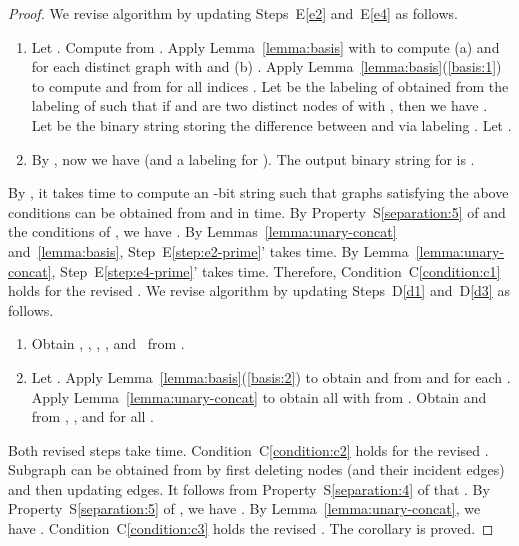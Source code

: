 \documentclass[12pt]{article}
\begin{document}
\begin{proof}
We revise algorithm  by updating Steps~E\ref{e2}
and~E\ref{e4} as follows.
\begin{enumerate}[\em E1':]
\addtolength{\itemsep}{-0.5\baselineskip}
\setcounter{enumi}{1}
\item 
\label{step:e2-prime}
Let .  Compute  from
.  Apply Lemma~\ref{lemma:basis} with
 to compute (a)
 and  for each distinct graph
 with  and (b) .
Apply Lemma~\ref{lemma:basis}(\ref{basis:1}) to compute
 and
 from  for all
indices .  Let  be the labeling of 
obtained from the labeling  of  such that if  and
 are two distinct nodes of  with
, then we have .
Let  be the binary string storing the difference
between  and  via labeling .  Let
.

\setcounter{enumi}{3}
\item 
\label{step:e4-prime}
By , now we have 
(and a labeling  for ).  The output binary string
 for  is
.
\end{enumerate}
By , it takes  time to compute an
-bit string  such that graphs 
satisfying the above conditions can be obtained from
 and  in  time.  By
Property~S\ref{separation:5} of  and the conditions of
, we have .  By Lemmas~\ref{lemma:unary-concat}
and~\ref{lemma:basis}, Step~E\ref{step:e2-prime}' takes  time.
By Lemma~\ref{lemma:unary-concat}, Step~E\ref{step:e4-prime}' takes
 time.  Therefore, Condition~C\ref{condition:c1} holds for the
revised .
We revise algorithm  by updating Steps~D\ref{d1}
and~D\ref{d3} as follows.
\begin{enumerate}[\em D1':]
\addtolength{\itemsep}{-0.5\baselineskip}
\item 
Obtain , ,
, , and~ from
.

\setcounter{enumi}{2}
\item 
Let .  Apply
Lemma~\ref{lemma:basis}(\ref{basis:2}) to obtain  and
 from
 and
 for each .  Apply
Lemma~\ref{lemma:unary-concat} to obtain all  with
 from .  Obtain  and 
from , , and  for all .
\end{enumerate}
Both revised steps take  time.  Condition~C\ref{condition:c2}
holds for the revised .  Subgraph  can be
obtained from  by first deleting  nodes (and their
incident edges) and then updating  edges.  It follows
from Property~S\ref{separation:4} of  that
.  By
Property~S\ref{separation:5} of , we have
. By Lemma~\ref{lemma:unary-concat}, we have
.  Condition~C\ref{condition:c3} holds the
revised .  The corollary is proved.
\end{proof}
\end{document}
